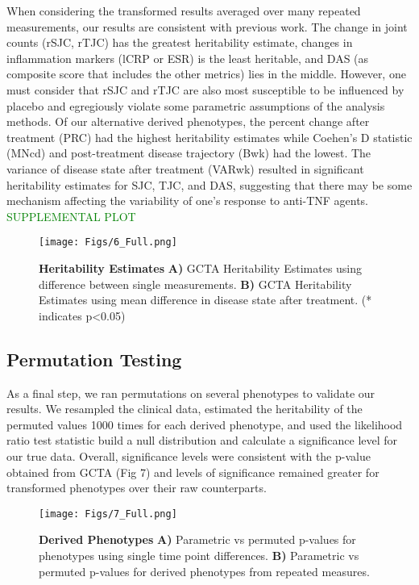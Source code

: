 When considering the transformed results averaged over many repeated measurements, our results are consistent with previous work. The change in joint counts (rSJC, rTJC) has the greatest heritability estimate, changes in inflammation markers (lCRP or ESR) is the least heritable, and DAS (as composite score that includes the other metrics) lies in the middle. However, one must consider that rSJC and rTJC are also most susceptible to be influenced by placebo and egregiously violate some parametric assumptions of the analysis methods. Of our alternative derived phenotypes, the percent change after treatment (PRC) had the highest heritability estimates while Coehen’s D statistic (MNcd) and post-treatment disease trajectory (Bwk) had the lowest. The variance of disease state after treatment (VARwk) resulted in significant heritability estimates for SJC, TJC, and DAS, suggesting that there may be some mechanism affecting the variability of one’s response to anti-TNF agents. \textcolor{green}{SUPPLEMENTAL PLOT}

\begin{figure}[h!]
  \centering
  \texttt{[image: Figs/6\_Full.png]}
  \caption{ {\bf Heritability Estimates} {\bf A)} GCTA Heritability Estimates using difference between single measurements. {\bf B)} GCTA Heritability Estimates using mean difference in disease state after treatment. (* indicates p<0.05) }
  \label{FIG_6}
\end{figure}


\subsection{Permutation Testing}

As a final step, we ran permutations on several phenotypes to validate our results. We resampled the clinical data, estimated the heritability of the permuted values 1000 times for each derived phenotype, and used the likelihood ratio test statistic build a null distribution and calculate a significance level for our true data. Overall, significance levels were consistent with the p-value obtained from GCTA (Fig 7) and levels of significance remained greater for transformed phenotypes over their raw counterparts.

\begin{figure}[h!]
  \centering
  \texttt{[image: Figs/7\_Full.png]}
  \caption{ {\bf Derived Phenotypes} {\bf A)} Parametric vs permuted p-values for phenotypes using single time point differences. {\bf B)} Parametric vs permuted p-values for derived phenotypes from repeated measures. }
  \label{FIG_7}
\end{figure}
